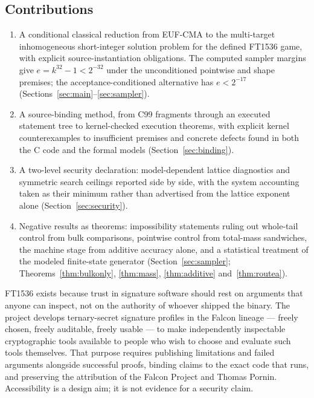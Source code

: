 \subsection{Contributions}
\begin{enumerate}
\item A conditional classical reduction from EUF-CMA to the multi-target
inhomogeneous short-integer solution problem for the defined FT1536
game, with explicit source-instantiation obligations. The computed
sampler margins give $e=k^{32}-1<2^{-32}$ under the unconditioned
pointwise and shape premises; the acceptance-conditioned alternative
has $e<2^{-17}$ (Sections~\ref{sec:main}--\ref{sec:sampler}).
\item A source-binding method, from C99 fragments through an executed
statement tree to kernel-checked execution theorems, with explicit
kernel counterexamples to insufficient premises and concrete defects
found in both the C code and the formal models
(Section~\ref{sec:binding}).
\item A two-level security declaration: model-dependent lattice
diagnostics and symmetric search ceilings reported side by side, with
the system accounting taken as their minimum rather than advertised
from the lattice exponent alone
(Section~\ref{sec:security}).
\item Negative results as theorems: impossibility statements ruling out
whole-tail control from bulk comparisons, pointwise control from
total-mass sandwiches, the machine stage from additive accuracy alone,
and a statistical treatment of the modeled finite-state generator
(Section~\ref{sec:sampler}; Theorems~\ref{thm:bulkonly},
\ref{thm:mass}, \ref{thm:additive} and~\ref{thm:routea}).
\end{enumerate}

FT1536 exists because trust in signature software should rest on
arguments that anyone can inspect, not on the authority of whoever
shipped the binary. The project develops ternary-secret signature
profiles in the Falcon lineage --- freely chosen, freely auditable,
freely usable --- to make independently inspectable cryptographic tools
available to people who wish to choose and evaluate such tools
themselves. That purpose requires publishing limitations and failed
arguments alongside successful proofs, binding claims to the exact code
that runs, and preserving the attribution of the Falcon Project and
Thomas Pornin. Accessibility is a design aim; it is not evidence for a
security claim.

